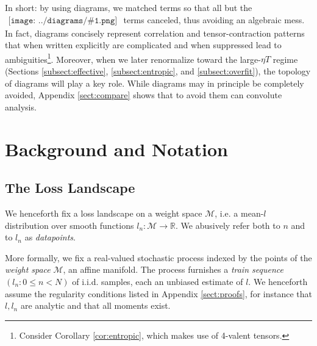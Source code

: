 \documentclass{article}
\newcommand{\Mm}{\mathcal{M}}
\newcommand{\RR}{\mathbb{R}}
\newcommand{\sdia}[1]{\begin{gathered}\texttt{[image: ../diagrams/\#1.png]}\end{gathered}}
\begin{document}
            In short: by using diagrams, we matched terms so that all but the
            $\sdia{c(01-2)(01-12)}$ terms canceled, thus avoiding an algebraic
            mess.  In fact, diagrams concisely represent correlation and
            tensor-contraction patterns that when written explicitly are
            complicated and when suppressed lead to ambiguities\footnote{
                Consider Corollary \ref{cor:entropic}, which makes use of
                4-valent tensors.
            }.  Moreover, when we later renormalize toward the large-$\eta T$
            regime (Sections \ref{subsect:effective}, \ref{subsect:entropic},
            and \ref{subsect:overfit}), the topology of diagrams will play a
            key role.  While diagrams may in principle be completely avoided,
            Appendix \ref{sect:compare} shows that to avoid them can convolute
            analysis.   


\section{Background and Notation} \label{sect:background}


    \subsection{The Loss Landscape}
        We henceforth fix a loss landscape on a weight space $\Mm$, i.e. a
        mean-$l$ distribution over smooth functions $l_n:\Mm\to\RR$.
        We abusively refer both to $n$ and to $l_n$ as
        \emph{datapoints}.

        More formally, we fix a real-valued stochastic process indexed by the
        points of the \emph{weight space} $\Mm$, an affine manifold.  The
        process furnishes a \emph{train sequence} $(l_n: 0\leq n<N)$ of i.i.d.
        samples, each an unbiased estimate of $l$. We henceforth assume the
        regularity conditions listed in Appendix \ref{sect:proofs}, for
        instance that $l, l_n$ are analytic and that all moments exist.
\end{document}
